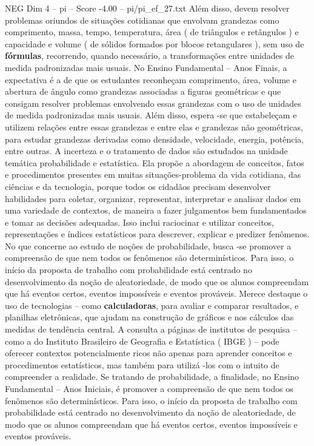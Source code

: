 \begin{textsample}{NEG Dim 4 – pi – Score -4.00 – pi/pi\_ef\_27.txt}
Além disso, devem resolver problemas oriundos de situações cotidianas que envolvam grandezas como comprimento, massa, tempo, temperatura, área ( de triângulos e retângulos ) e capacidade e volume ( de sólidos formados por blocos retangulares ), sem uso de \textbf{fórmulas}, recorrendo, quando necessário, a transformações entre unidades de medida padronizadas mais usuais.
No Ensino Fundamental – Anos Finais, a expectativa é a de que os estudantes reconheçam comprimento, área, volume e abertura de ângulo como grandezas associadas a figuras geométricas e que consigam resolver problemas envolvendo essas grandezas com o uso de unidades de medida padronizadas mais usuais.
Além disso, espera -se que estabeleçam e utilizem relações entre essas grandezas e entre elas e grandezas não geométricas, para estudar grandezas derivadas como densidade, velocidade, energia, potência, entre outras.
A incerteza e o tratamento de dados são estudados na unidade temática probabilidade e estatística.
Ela propõe a abordagem de conceitos, fatos e procedimentos presentes em muitas situações-problema da vida cotidiana, das ciências e da tecnologia, porque todos os cidadãos precisam desenvolver habilidades para coletar, organizar, representar, interpretar e analisar dados em uma variedade de contextos, de maneira a fazer julgamentos bem fundamentados e tomar as decisões adequadas.
Isso inclui raciocinar e utilizar conceitos, representações e índices estatísticos para descrever, explicar e predizer fenômenos.
No que concerne ao estudo de noções de probabilidade, busca -se promover a compreensão de que nem todos os fenômenos são determinísticos.
Para isso, o início da proposta de trabalho com probabilidade está centrado no desenvolvimento da noção de aleatoriedade, de modo que os alunos compreendam que há eventos certos, eventos impossíveis e eventos prováveis.
Merece destaque o uso de tecnologias – como \textbf{calculadoras}, para avaliar e comparar resultados, e planilhas eletrônicas, que ajudam na construção de gráficos e nos cálculos das medidas de tendência central.
A consulta a páginas de institutos de pesquisa – como a do Instituto Brasileiro de Geografia e Estatística ( IBGE ) – pode oferecer contextos potencialmente ricos não apenas para aprender conceitos e procedimentos estatísticos, mas também para utilizá -los com o intuito de compreender a realidade.
Se tratando de probabilidade, a finalidade, no Ensino Fundamental – Anos Iniciais, é promover a compreensão de que nem todos os fenômenos são determinísticos.
Para isso, o início da proposta de trabalho com probabilidade está centrado no desenvolvimento da noção de aleatoriedade, de modo que os alunos compreendam que há eventos certos, eventos impossíveis e eventos prováveis.

\end{textsample}

